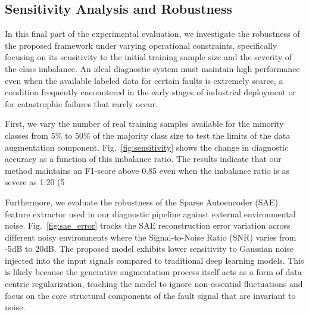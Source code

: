 \documentclass[conference,twocolumn]{IEEEtran}
\begin{document}
\subsection{Sensitivity Analysis and Robustness}
\label{subsec:sensitivity}

In this final part of the experimental evaluation, we investigate the robustness of the proposed framework under varying operational constraints, specifically focusing on its sensitivity to the initial training sample size and the severity of the class imbalance. An ideal diagnostic system must maintain high performance even when the available labeled data for certain faults is extremely scarce, a condition frequently encountered in the early stages of industrial deployment or for catastrophic failures that rarely occur.

First, we vary the number of real training samples available for the minority classes from 5\% to 50\% of the majority class size to test the limits of the data augmentation component.  Fig.~\ref{fig:sensitivity} shows the change in diagnostic accuracy as a function of this imbalance ratio. The results indicate that our method maintains an F1-score above 0.85 even when the imbalance ratio is as severe as 1:20 (5%

Furthermore, we evaluate the robustness of the Sparse Autoencoder (SAE) feature extractor used in our diagnostic pipeline against external environmental noise.  Fig.~\ref{fig:sae_error} tracks the SAE reconstruction error variation across different noisy environments where the Signal-to-Noise Ratio (SNR) varies from -5dB to 20dB. The proposed model exhibits lower sensitivity to Gaussian noise injected into the input signals compared to traditional deep learning models. This is likely because the generative augmentation process itself acts as a form of data-centric regularization, teaching the model to ignore non-essential fluctuations and focus on the core structural components of the fault signal that are invariant to noise.
\end{document}
